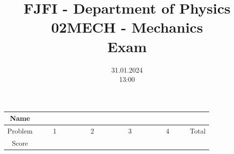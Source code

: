 \documentclass[a4paper,12pt]{article}
\title{{\Large FJFI - Department of Physics} \\ 
                  02MECH - Mechanics \\ 
          {\Large \textbf{Exam}}\vspace{-1cm}}
\date{31.01.2024 \\ 13:00}
\author{}
\begin{document}
\maketitle
\vspace{-1.5em}

\begin{center}
    \renewcommand{\arraystretch}{2}
    \begin{tabular}{ |c|c|c|c|c|c| } 
        \hline
        Name& \multicolumn{5}{c|}{\phantom{~~~~~~~~~~~~~~~~~~~~~~~~~~~~~~~~~~~~~~~~~~~~~~~~~~~~~~~~~~~~~~~~~~~~~~~~~~~~~~~}}\\
        \hline
        Problem & ~~~~1~~~~ & ~~~~2~~~~ & ~~~~3~~~~ & ~~~~4~~~~ & Total \\ 
        \hline
        Score & &  & & & \\
        \hline
    \end{tabular}
\end{center}

\vspace*{1cm}







\end{document}
